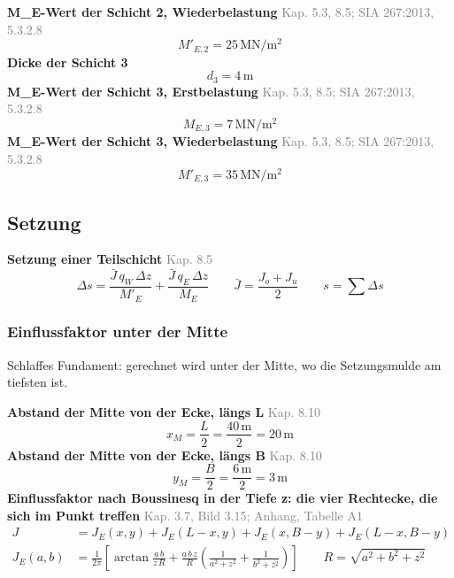 \documentclass[11pt,a4paper]{article}
\newcommand{\normref}[1]{{\small\textcolor{gray}{#1}}}
\begin{document}
\noindent\textbf{M\_E-Wert der Schicht 2, Wiederbelastung} \hfill \normref{Kap. 5.3, 8.5; SIA 267:2013, 5.3.2.8}
\begin{equation*}
M'_{E,2} = 25\,\mathrm{MN}/\mathrm{m}^{2}
\end{equation*}
\noindent\textbf{Dicke der Schicht 3}
\begin{equation*}
d_{3} = 4\,\mathrm{m}
\end{equation*}
\noindent\textbf{M\_E-Wert der Schicht 3, Erstbelastung} \hfill \normref{Kap. 5.3, 8.5; SIA 267:2013, 5.3.2.8}
\begin{equation*}
M_{E,3} = 7\,\mathrm{MN}/\mathrm{m}^{2}
\end{equation*}
\noindent\textbf{M\_E-Wert der Schicht 3, Wiederbelastung} \hfill \normref{Kap. 5.3, 8.5; SIA 267:2013, 5.3.2.8}
\begin{equation*}
M'_{E,3} = 35\,\mathrm{MN}/\mathrm{m}^{2}
\end{equation*}
\subsection{Setzung}
\noindent\textbf{Setzung einer Teilschicht} \hfill \normref{Kap. 8.5}
\begin{equation*}
\Delta s = \frac{\bar{J} \, q_W \, \Delta z}{M'_E} + \frac{\bar{J} \, q_E \, \Delta z}{M_E} \qquad \bar{J} = \frac{J_o + J_u}{2} \qquad s = \sum \Delta s
\end{equation*}
\subsubsection{Einflussfaktor unter der Mitte}
Schlaffes Fundament: gerechnet wird unter der Mitte, wo die Setzungsmulde am tiefsten ist.

\noindent\textbf{Abstand der Mitte von der Ecke, längs L} \hfill \normref{Kap. 8.10}
\begin{equation*}
x_M = \frac{L}{2} = \frac{40\,\mathrm{m}}{2} = 20\,\mathrm{m}
\end{equation*}
\noindent\textbf{Abstand der Mitte von der Ecke, längs B} \hfill \normref{Kap. 8.10}
\begin{equation*}
y_M = \frac{B}{2} = \frac{6\,\mathrm{m}}{2} = 3\,\mathrm{m}
\end{equation*}
\noindent\textbf{Einflussfaktor nach Boussinesq in der Tiefe z: die vier Rechtecke, die sich im Punkt treffen} \hfill \normref{Kap. 3.7, Bild 3.15; Anhang, Tabelle A1}
\begin{equation*}
\begin{aligned} J &= J_E(x, y) + J_E(L - x, y) + J_E(x, B - y) + J_E(L - x, B - y) \\ J_E(a, b) &= \frac{1}{2\pi} \left[\arctan\frac{a \, b}{z \, R} + \frac{a \, b \, z}{R} \left(\frac{1}{a^2 + z^2} + \frac{1}{b^2 + z^2}\right)\right] \qquad R = \sqrt{a^2 + b^2 + z^2} \end{aligned}
\end{equation*}
\end{document}
